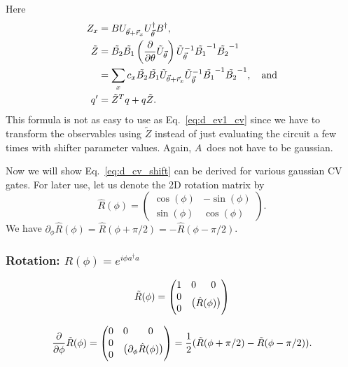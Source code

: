 \documentclass[aps,pra,10pt,twocolumn,groupedaddress,nofootinbib]{revtex4-1}
\theoremstyle{plain}
\newcommand{\pd}[2]{\frac{\partial #1}{\partial #2}}  %
\newcommand{\be}{\begin{equation}}
\newcommand{\ee}{\end{equation}}
\newcommand{\Admap}[1]{\tilde{#1}} %
\begin{document}
Here
\begin{align}
Z_x &= B  U_{\vt+\vR_x} U_{\vt}^\dagger B^\dagger,\\
\Admap{Z} &= \Admap{B_2} \Admap{B_1} \left(\pd{}{\theta} \Admap{U}_{\vt}\right) \Admap{U}_{\vt}^{-1} \Admap{B_1}^{-1} \Admap{B_2}^{-1}\\
&= \sum_x c_x \Admap{B_2} \Admap{B_1} \Admap{U}_{\vt+\vR_x} \Admap{U}_{\vt}^{-1} \Admap{B_1}^{-1} \Admap{B_2}^{-1}, \quad \text{and}\\
q' &= \Admap{Z}^T q +q \Admap{Z}.
\end{align}
This formula is not as easy to use as Eq.~\eqref{eq:d_ev1_cv}
since we have to transform the observables using $\Admap{Z}$
instead of just evaluating the circuit a few times with shifter parameter values.
Again, $A$~does not have to be gaussian.

Now we will show Eq.~\eqref{eq:d_cv_shift}
can be derived for various gaussian CV gates.
For later use, let us denote the 2D rotation matrix by
\be
\hat{R}(\phi) =
\begin{pmatrix}
  \cos(\phi) & -\sin(\phi)\\
\sin(\phi) & \cos(\phi)
\end{pmatrix}.
\ee
We have
$\partial_\phi \hat{R}(\phi) = \hat{R}(\phi+\pi/2) = -\hat{R}(\phi-\pi/2)$.

\def\block(#1,#2)#3{\multicolumn{#2}{c}{\multirow{#1}{*}{$\begin{pmatrix} #3 \end{pmatrix}$}}}


\subsubsection{Rotation: $R(\phi) = e^{i \phi a^\dagger a}$}

\begin{align*}
\Admap{R}(\phi)
=
\begin{pmatrix}
  1&0&0\\
  0 & \block(2,2){\hat{R}(\phi)}\\
  0
\end{pmatrix}
\end{align*}

\begin{align*}
\pd{}{\phi} \Admap{R}(\phi)
=
\begin{pmatrix}
  0&0&0\\
  0 & \block(2,2){\partial_\phi \hat{R}(\phi)}\\
  0
\end{pmatrix}
= \frac{1}{2}(\Admap{R}(\phi+\pi/2) -\Admap{R}(\phi-\pi/2)).
\end{align*}
\end{document}
